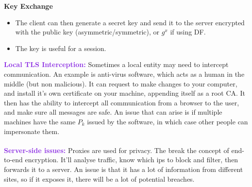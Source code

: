 \documentclass[a4paper,10pt]{article}
\begin{document}
\textbf{Key Exchange}
\begin{itemize}
\item The client can then generate a secret key and send it to the server encrypted with the public key (asymmetric/symmetric), or $g^{x}$ if using DF. 
\item The key is useful for a session. 
\end{itemize}
\textcolor{BlueViolet}{\textbf{Local TLS Interception:}} Sometimes a local entity may need to intercept communication. An example is anti-virus software, which acts as a human in the middle (but non malicious). It can request to make changes to your computer, and install it's own certificate on your machine, appending itself as a root CA. It then has the ability to intercept all communication from a browser to the user, and make sure all messages are safe. An issue that can arise is if multiple machines have the same $P_k$ issued by the software, in which case other people can impersonate them. \\\\ 
\textcolor{BlueViolet}{\textbf{Server-side issues:}} Proxies are used for privacy. The break the concept of end-to-end encryption. It'll analyse traffic, know which ips to block and filter, then forwards it to a server. An issue is that it has a lot of information from different sites, so if it exposes it, there will be a lot of potential breaches. \\\\
\end{document}
